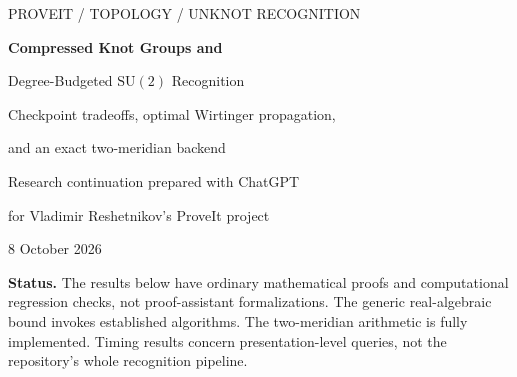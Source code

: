 \documentclass[11pt]{article}
\theoremstyle{definition}
\theoremstyle{remark}
\newcommand{\SU}{\mathrm{SU}(2)}
\newcommand{\poly}{\operatorname{poly}}
\begin{document}
\begin{titlepage}
\vspace*{12mm}
{\small\sffamily PROVEIT / TOPOLOGY / UNKNOT RECOGNITION\par}
\vspace{12mm}
{\LARGE\bfseries Compressed Knot Groups and\par Degree-Budgeted $\SU$ Recognition\par}
\vspace{7mm}
{\large Checkpoint tradeoffs, optimal Wirtinger propagation,\par and an exact two-meridian backend\par}
\vspace{12mm}
{Research continuation prepared with ChatGPT\par for Vladimir Reshetnikov's ProveIt project\par}
\vspace{4mm}
{8 October 2026\par}
\vspace{12mm}
\begin{abstract}
We develop a complete algebraic continuation of a certified knot-group simplifier, rather than another one-sided finite-quotient filter. For a presentation with $r$ generators and a straight-line-program word grammar, a set of $c$ polynomial checkpoints gives an exact nonabelian $\SU$ feasibility problem with $4(r+c)$ real variables and degree controlled by an explicitly computable quantity $\Delta$. Standard existential-real algorithms then give bit complexity $\poly(N)(\Delta+2)^{O(r+c)}$, where $N$ is the encoded presentation size. We prove that mixed checkpointing can improve the exponent asymptotically over both full substitution and full lifting, and give an optimal checkpoint dynamic program for formula trees.

For two \emph{certified meridian} generators, we avoid real algebraic elimination altogether. Every traceless word has a normal form consisting of an integer and two parity bits. Exact feasibility reduces to a greatest-common-divisor calculation and parity checks, in time polynomial in the compressed input size even when the represented words are exponentially long. We also prove optimal fixed-seed Wirtinger degree propagation, a polynomial recognition bound for diagrams admitting two-seed propagation, and a quasi-polynomial bound for logarithmically many visible overpasses. The package supplies tested arithmetic, compilers, replayable certificates, independent symbolic comparisons, and reproducible measurements. It does not prove a general quasi-polynomial bound for the maintained recognizer or implement a general singly exponential real-feasibility engine.
\end{abstract}
\vfill
\small
\textbf{Status.} The results below have ordinary mathematical proofs and computational regression checks, not proof-assistant formalizations. The generic real-algebraic bound invokes established algorithms. The two-meridian arithmetic is fully implemented. Timing results concern presentation-level queries, not the repository's whole recognition pipeline.
\end{titlepage}
\begingroup\small\setlength{\parskip}{0pt}
\tableofcontents
\endgroup
\newpage
\end{document}

